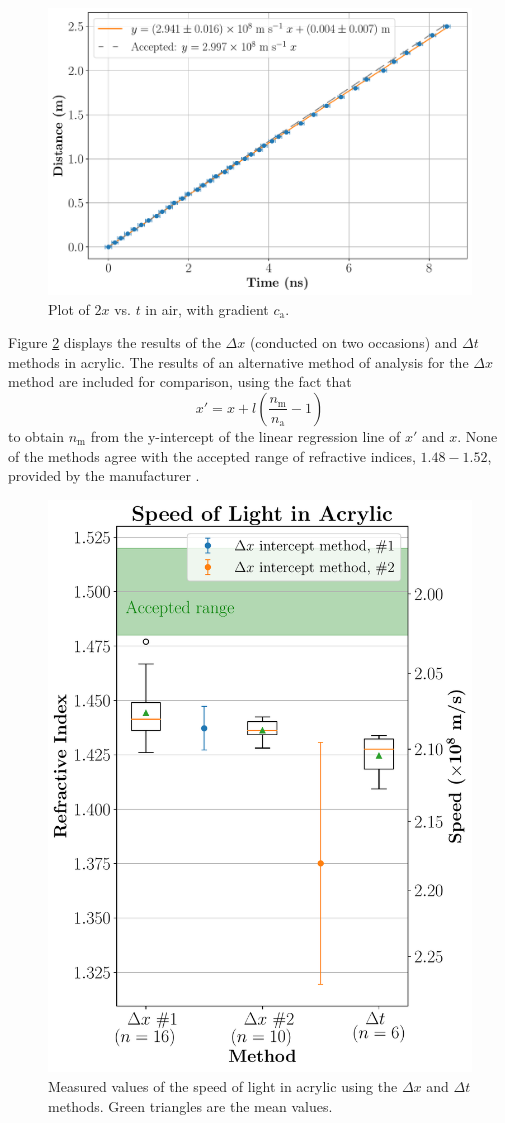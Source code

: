 \documentclass[
    aps,
    prl,
    reprint,
    10pt,
    amsmath,
    amssymb,
    a4paper,
    longbibliography
]{revtex4-2}
\begin{document}
\begin{figure}[ht]
    \centering
    \includegraphics[width=\linewidth]{air}
    \caption{Plot of $2x$ vs. $t$ in air, with gradient $c_\mathrm{a}$.}
    \label{air_plot}
\end{figure}

Figure \ref{acrylic_plot} displays the results of the $\Delta x$
(conducted on two occasions) and $\Delta t$ methods in acrylic.
The results of an alternative method of analysis for the $\Delta x$
method are included for comparison, using the fact that
\[
    x' = x + l \left( \frac{n_\mathrm{m}}{n_\mathrm{a}} - 1 \right)
\]
to obtain $n_\mathrm{m}$ from the y-intercept of the linear regression line of
$x'$ and $x$. None of the methods agree with the accepted range of refractive
indices, $1.48 - 1.52$, provided by the manufacturer
\cite{phywebrochure}.

\begin{figure}[ht]
    \centering
    \includegraphics[width=0.7\linewidth]{acrylic}
    \caption{Measured values of the speed of light in acrylic using
        the $\Delta x$ and $\Delta t$ methods. Green triangles are
        the mean values.}
    \label{acrylic_plot}
\end{figure}
\end{document}
